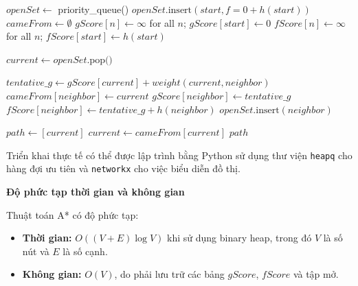 \begin{algorithm}[H]
\caption{Thuật toán A*}
\begin{algorithmic}[1]
    \State $openSet \gets$ priority\_queue() 
    \State $openSet.\text{insert}(start, f = 0 + h(start))$
    \State $cameFrom \gets \emptyset$ 
    \State $gScore[n] \gets \infty$ for all $n$; \quad $gScore[start] \gets 0$
    \State $fScore[n] \gets \infty$ for all $n$; \quad $fScore[start] \gets h(start)$
    
        \State $current \gets openSet.\text{pop()}$ 
            \State \Return {}
        \EndIf
        
            \State $tentative\_g \gets gScore[current] + weight(current, neighbor)$
                \State $cameFrom[neighbor] \gets current$
                \State $gScore[neighbor] \gets tentative\_g$
                \State $fScore[neighbor] \gets tentative\_g + h(neighbor)$
                    \State $openSet.\text{insert}(neighbor)$
                \EndIf
            \EndIf
        \EndFor
    \EndWhile
    
    \State \Return {}
\EndFunction

    \State $path \gets [current]$
        \State $current \gets cameFrom[current]$
        \State {}
    \EndWhile
    \State \Return $path$
\EndFunction
\end{algorithmic}
\end{algorithm}

\noindent
Triển khai thực tế có thể được lập trình bằng Python sử dụng thư viện \texttt{heapq} cho hàng đợi ưu tiên và \texttt{networkx} cho việc biểu diễn đồ thị.

\textbf{Độ phức tạp thời gian và không gian}

Thuật toán A* có độ phức tạp:

\begin{itemize}
    \item \textbf{Thời gian:} $O((V + E) \log V)$ khi sử dụng binary heap, trong đó $V$ là số nút và $E$ là số cạnh.
    \item \textbf{Không gian:} $O(V)$, do phải lưu trữ các bảng $gScore$, $fScore$ và tập mở.
\end{itemize}


